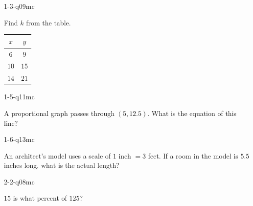 
\begin{practiceQuestion}{1-3-q09}{mc}
\begin{questionText}
Find $k$ from the table.

\begin{center}
\begin{tabular}{|c|c|}
\hline $x$ & $y$ \\ \hline $6$ & $9$ \\ $10$ & $15$ \\ $14$ & $21$ \\ \hline
\end{tabular}
\end{center}
\end{questionText}
\end{practiceQuestion}

\begin{practiceQuestion}{1-5-q11}{mc}
\begin{questionText}
A proportional graph passes through $(5, 12.5)$. What is the equation of this line?
\end{questionText}
\end{practiceQuestion}

\begin{practiceQuestion}{1-6-q13}{mc}
\begin{questionText}
An architect's model uses a scale of $1$ inch $= 3$ feet. If a room in the model is $5.5$ inches long, what is the actual length?
\end{questionText}
\end{practiceQuestion}

\begin{practiceQuestion}{2-2-q08}{mc}
\begin{questionText}
$15$ is what percent of $125$?
\end{questionText}
\end{practiceQuestion}

